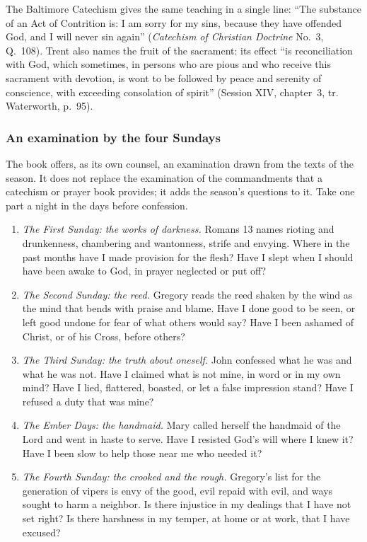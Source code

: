 \noindent The Baltimore Catechism gives the same teaching in a single line: ``The substance of an Act of
Contrition is: I am sorry for my sins, because they have offended God, and I will never sin again''
(\textit{Catechism of Christian Doctrine} No.~3, Q.~108). Trent also names the fruit of the
sacrament: its effect ``is reconciliation with God, which sometimes, in persons who are pious and
who receive this sacrament with devotion, is wont to be followed by peace and serenity of conscience,
with exceeding consolation of spirit'' (Session XIV, chapter~3, tr. Waterworth, p.~95).

\subsubsection{An examination by the four Sundays}

The book offers, as its own counsel, an examination drawn from the texts of the season. It does not
replace the examination of the commandments that a catechism or prayer book provides; it adds the
season's questions to it. Take one part a night in the days before confession.

\begin{enumerate}[leftmargin=1.5em, itemsep=0.5ex]
\item \textit{The First Sunday: the works of darkness.} Romans 13 names rioting and drunkenness,
chambering and wantonness, strife and envying. Where in the past months have I made provision for
the flesh? Have I slept when I should have been awake to God, in prayer neglected or put off?
\item \textit{The Second Sunday: the reed.} Gregory reads the reed shaken by the wind as the mind
that bends with praise and blame. Have I done good to be seen, or left good undone for fear of
what others would say? Have I been ashamed of Christ, or of his Cross, before others?
\item \textit{The Third Sunday: the truth about oneself.} John confessed what he was and what he
was not. Have I claimed what is not mine, in word or in my own mind? Have I lied, flattered,
boasted, or let a false impression stand? Have I refused a duty that was mine?
\item \textit{The Ember Days: the handmaid.} Mary called herself the handmaid of the Lord and went
in haste to serve. Have I resisted God's will where I knew it? Have I been slow to help those near
me who needed it?
\item \textit{The Fourth Sunday: the crooked and the rough.} Gregory's list for the generation of
vipers is envy of the good, evil repaid with evil, and ways sought to harm a neighbor. Is there
injustice in my dealings that I have not set right? Is there harshness in my temper, at home or at
work, that I have excused?
\end{enumerate}

